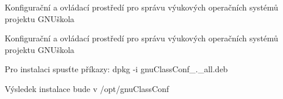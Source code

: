 Konfigurační a ovládací prostředí pro správu výukových operačních systémů projektu G\-N\-Uškola

Konfigurační a ovládací prostředí pro správu výukových operačních systémů projektu G\-N\-Uškola

Pro instalaci spusťte příkazy\-: dpkg -\/i gnu\-Class\-Conf\-\_.\-\_\-all.\-deb

Výsledek instalace bude v /opt/gnu\-Class\-Conf 